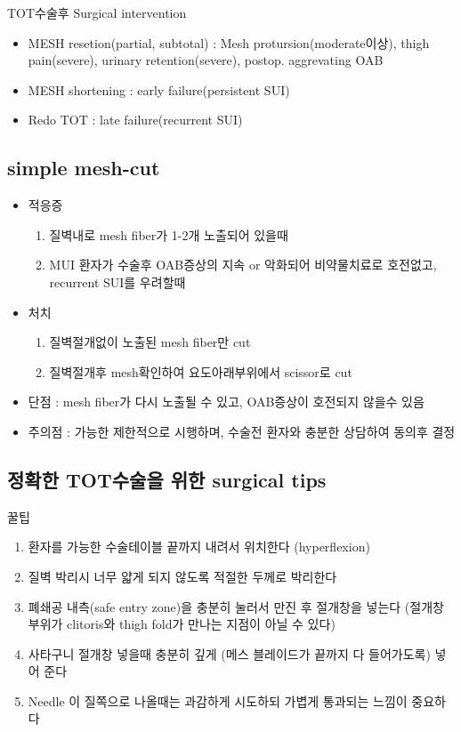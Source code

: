 \begin{commentbox}{TOT수술후 Surgical intervention}
\begin{itemize}\tightlist
\item MESH resetion(partial, subtotal) : Mesh protursion(moderate이상), thigh pain(severe), urinary retention(severe), postop. aggrevating OAB
\item MESH shortening : early failure(persistent SUI)
\item Redo TOT : late failure(recurrent SUI)
\end{itemize}
\end{commentbox}

\subsection{simple mesh-cut}
\begin{itemize}\tightlist
\item 적응증
  \begin{enumerate}[①]\tightlist
  \item 질벽내로 mesh fiber가 1-2개 노출되어 있을때
  \item MUI 환자가 수술후 OAB증상의 지속 or 악화되어 비약물치료로 호전없고, recurrent SUI를 우려할때 
  \end{enumerate}
\item 처치 
  \begin{enumerate}[①]\tightlist
  \item 질벽절개없이 노출된 mesh fiber만 cut
  \item 질벽절개후  mesh확인하여 요도아래부위에서 scissor로 cut
  \end{enumerate}
\item 단점 : mesh fiber가 다시 노출될 수 있고, OAB증상이 호전되지 않을수 있음
\item 주의점 : 가능한 제한적으로 시행하며, 수술전 환자와 충분한 상담하여 동의후 결정     
\end{itemize}

\subsection{정확한 TOT수술을 위한 surgical tips}
\begin{commentbox}{꿀팁}
\begin{enumerate}\tightlist
\item 환자를 가능한 수술테이블 끝까지 내려서 위치한다  (hyperflexion)
\item 질벽 박리시 너무 얇게 되지 않도록 적절한 두께로 박리한다
\item 폐쇄공 내측(safe entry zone)을  충분히 눌러서  만진 후 절개창을  넣는다  (절개창 부위가 clitoris와 thigh fold가 만나는 지점이  아닐 수 있다)
\item 사타구니 절개창 넣을때  충분히 깊게 (메스 블레이드가 끝까지 다 들어가도록) 넣어 준다 
\item Needle 이 질쪽으로  나올때는 과감하게 시도하되 가볍게 통과되는 느낌이 중요하다
\end{enumerate}
\end{commentbox}
